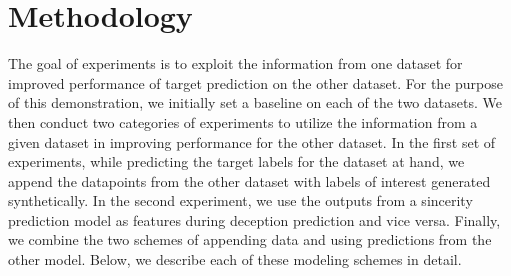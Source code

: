 \documentclass{article}
\begin{document}
\section{Methodology}

The goal of experiments is to exploit the information from one dataset for improved performance of target prediction on the other dataset.
For the purpose of this demonstration, we initially set a baseline on each of the two datasets.
We then conduct two categories of experiments to utilize the information from a given dataset in improving performance for the other dataset. 
In the first set of experiments, while predicting the target labels for the dataset at hand, we append the datapoints from the other dataset with labels of interest generated synthetically. 
In the second experiment, we use the outputs from a sincerity prediction model as features during deception prediction and vice versa.
Finally, we combine the two schemes of appending data and using predictions from the other model.
Below, we describe each of these modeling schemes in detail. 
\end{document}

